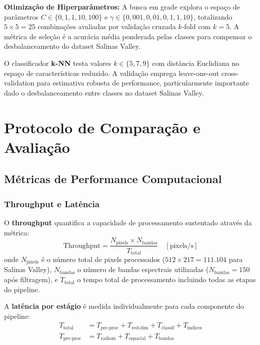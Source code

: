 \textbf{Otimização de Hiperparâmetros:} A busca em grade explora o espaço 
de parâmetros $C \in \{0{,}1, 1, 10, 100\}$ e $\gamma \in \{0{,}001, 0{,}01, 0{,}1, 1, 10\}$, 
totalizando $5 \times 5 = 25$ combinações avaliadas por validação cruzada $k$-fold com $k=5$. 
A métrica de seleção é a acurácia média ponderada pelas classes para 
compensar o desbalanceamento do dataset Salinas Valley.

O classificador \textbf{k-NN} testa valores $k \in \{5, 7, 9\}$ com distância Euclidiana 
no espaço de características reduzido. A validação emprega leave-one-out 
cross-validation para estimativa robusta de performance, particularmente 
importante dado o desbalanceamento entre classes no dataset Salinas Valley.

\section{Protocolo de Comparação e Avaliação}\label{sec:protocolo_avaliacao}

\subsection{Métricas de Performance Computacional}\label{subsec:metricas_performance}

\subsubsection{Throughput e Latência}

O \textbf{throughput} quantifica a capacidade de processamento sustentado 
através da métrica:
\begin{equation}
\text{Throughput} = \frac{N_{\text{pixels}} \times N_{\text{bandas}}}{T_{\text{total}}} \quad [\text{pixels/s}]
\label{eq:throughput}
\end{equation}
onde $N_{\text{pixels}}$ é o número total de pixels processados ($512 \times 217 = 111{.}104$ 
para Salinas Valley), $N_{\text{bandas}}$ o número de bandas espectrais utilizadas 
($N_{\text{bandas}} = 150$ após filtragem), e $T_{\text{total}}$ o tempo total de processamento incluindo 
todas as etapas do pipeline.

A \textbf{latência por estágio} é medida individualmente para cada componente 
do pipeline:
\begin{align}
T_{\text{total}} &= T_{\text{pre-proc}} + T_{\text{red-dim}} + T_{\text{classif}} + T_{\text{indices}} \label{eq:latencia_total} \\
T_{\text{pre-proc}} &= T_{\text{radiom}} + T_{\text{espacial}} + T_{\text{bandas}} \label{eq:latencia_preproc}
\end{align}

